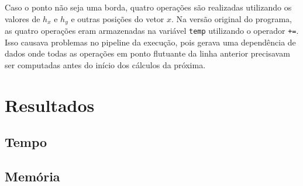 \documentclass[12pt]{article}
\begin{document}
	Caso o ponto não seja uma borda, quatro operações são realizadas utilizando os valores de $h_x$ e $h_y$ e outras posições do vetor $x$.
	Na versão original do programa, as quatro operações eram armazenadas na variável \texttt{temp} utilizando o operador \texttt{+=}.
	Isso causava problemas no pipeline da execução, pois gerava uma dependência de dados onde todas as operações em ponto flutuante da linha anterior precisavam ser computadas antes do início dos cálculos da próxima.

\newpage

\section{Resultados}

\subsection{Tempo}

\subsection{Memória}

\newpage
\end{document}
